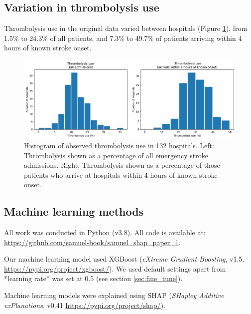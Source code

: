 \subsection{Variation in thrombolysis use}

Thrombolysis use in the original data varied between hospitals (Figure \ref{fig:observed_thrombolysis_appendix}), from 1.5\% to 24.3\% of all patients, and 7.3\% to 49.7\% of patients arriving within 4 hours of known stroke onset.

\begin{figure}
\centering
\includegraphics[width=1.0\textwidth]{./images/thrombolysis_hist}
\caption{Histogram of observed thrombolysis use in 132 hospitals. Left: Thrombolysis shown as a percentage of all emergency stroke admissions. Right: Thrombolysis shown as a percentage of those patients who arrive at hospitals within 4 hours of known stroke onset.}
\label{fig:observed_thrombolysis_appendix}
\end{figure}

\subsection{Machine learning methods}

All work was conducted in Python (v3.8). All code is available at: \url{https://github.com/samuel-book/samuel_shap_paper_1}.

Our machine learning model used XGBoost (\emph{eXtreme Gradient Boosting}, v1.5, \url{https://pypi.org/project/xgboost/}). We used default settings apart from *learning rate* was set at 0.5 (see section \ref{sec:fine_tune}).

Machine learning models were explained using SHAP (\emph{SHapley Additive exPlanations}, v0.41 \url{https://pypi.org/project/shap/}). 


